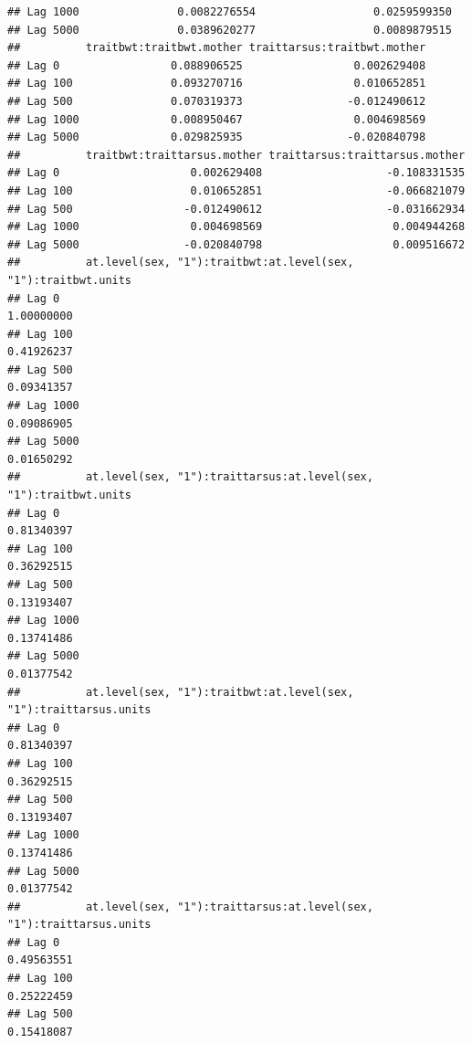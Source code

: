 \documentclass[
  12pt,
]{book}
\begin{document}
\begin{verbatim}
## Lag 1000               0.0082276554                  0.0259599350
## Lag 5000               0.0389620277                  0.0089879515
##          traitbwt:traitbwt.mother traittarsus:traitbwt.mother
## Lag 0                 0.088906525                 0.002629408
## Lag 100               0.093270716                 0.010652851
## Lag 500               0.070319373                -0.012490612
## Lag 1000              0.008950467                 0.004698569
## Lag 5000              0.029825935                -0.020840798
##          traitbwt:traittarsus.mother traittarsus:traittarsus.mother
## Lag 0                    0.002629408                   -0.108331535
## Lag 100                  0.010652851                   -0.066821079
## Lag 500                 -0.012490612                   -0.031662934
## Lag 1000                 0.004698569                    0.004944268
## Lag 5000                -0.020840798                    0.009516672
##          at.level(sex, "1"):traitbwt:at.level(sex, "1"):traitbwt.units
## Lag 0                                                       1.00000000
## Lag 100                                                     0.41926237
## Lag 500                                                     0.09341357
## Lag 1000                                                    0.09086905
## Lag 5000                                                    0.01650292
##          at.level(sex, "1"):traittarsus:at.level(sex, "1"):traitbwt.units
## Lag 0                                                          0.81340397
## Lag 100                                                        0.36292515
## Lag 500                                                        0.13193407
## Lag 1000                                                       0.13741486
## Lag 5000                                                       0.01377542
##          at.level(sex, "1"):traitbwt:at.level(sex, "1"):traittarsus.units
## Lag 0                                                          0.81340397
## Lag 100                                                        0.36292515
## Lag 500                                                        0.13193407
## Lag 1000                                                       0.13741486
## Lag 5000                                                       0.01377542
##          at.level(sex, "1"):traittarsus:at.level(sex, "1"):traittarsus.units
## Lag 0                                                             0.49563551
## Lag 100                                                           0.25222459
## Lag 500                                                           0.15418087

\end{verbatim}
\end{document}
